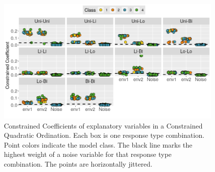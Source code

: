 	\begin{figure}[h!]
		\centering
		\includegraphics[width=1\linewidth]{../02_Figures/CQOPlotalsJpg}
		\caption{Constrained Coefficients of explanatory variables in a Constrained Quadratic Ordination. Each box is one response type combination. Point colors indicate the model class. The black line marks the highest weight of a noise variable for that response type combination. The points are horizontally jittered. }
		\label{fig:cqoweights}
	\end{figure}
















